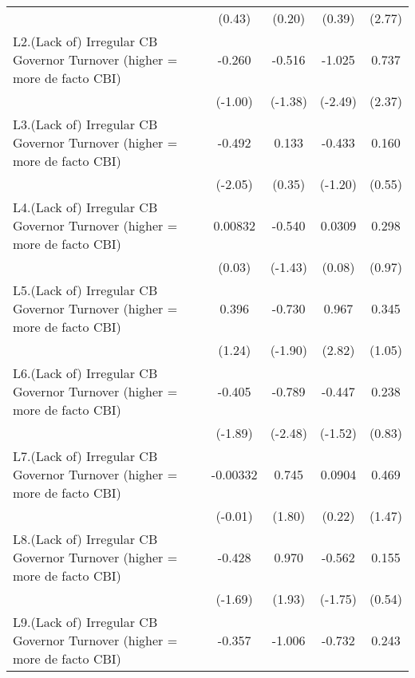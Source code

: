 {\begin{longtable}{l*{4}{c}}
                &   (0.43)         &   (0.20)         &   (0.39)         &   (2.77)         \\
[1em]
L2.(Lack of) Irregular CB Governor Turnover (higher = more de facto CBI)&   -0.260         &   -0.516         &   -1.025\sym{*}  &    0.737\sym{*}  \\
                &  (-1.00)         &  (-1.38)         &  (-2.49)         &   (2.37)         \\
[1em]
L3.(Lack of) Irregular CB Governor Turnover (higher = more de facto CBI)&   -0.492\sym{*}  &    0.133         &   -0.433         &    0.160         \\
                &  (-2.05)         &   (0.35)         &  (-1.20)         &   (0.55)         \\
[1em]
L4.(Lack of) Irregular CB Governor Turnover (higher = more de facto CBI)&  0.00832         &   -0.540         &   0.0309         &    0.298         \\
                &   (0.03)         &  (-1.43)         &   (0.08)         &   (0.97)         \\
[1em]
L5.(Lack of) Irregular CB Governor Turnover (higher = more de facto CBI)&    0.396         &   -0.730         &    0.967\sym{**} &    0.345         \\
                &   (1.24)         &  (-1.90)         &   (2.82)         &   (1.05)         \\
[1em]
L6.(Lack of) Irregular CB Governor Turnover (higher = more de facto CBI)&   -0.405         &   -0.789\sym{*}  &   -0.447         &    0.238         \\
                &  (-1.89)         &  (-2.48)         &  (-1.52)         &   (0.83)         \\
[1em]
L7.(Lack of) Irregular CB Governor Turnover (higher = more de facto CBI)& -0.00332         &    0.745         &   0.0904         &    0.469         \\
                &  (-0.01)         &   (1.80)         &   (0.22)         &   (1.47)         \\
[1em]
L8.(Lack of) Irregular CB Governor Turnover (higher = more de facto CBI)&   -0.428         &    0.970         &   -0.562         &    0.155         \\
                &  (-1.69)         &   (1.93)         &  (-1.75)         &   (0.54)         \\
[1em]
L9.(Lack of) Irregular CB Governor Turnover (higher = more de facto CBI)&   -0.357         &   -1.006\sym{**} &   -0.732\sym{*}  &    0.243         \\

\end{longtable}}
